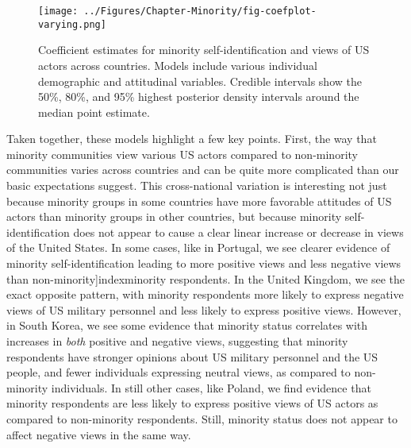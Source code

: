 \begin{figure}[t]
	\texttt{[image: ../Figures/Chapter-Minority/fig-coefplot-varying.png]}
	\caption{Coefficient estimates for minority self-identification and views of US actors across countries. Models include various individual demographic and attitudinal variables. Credible intervals show the 50\%, 80\%, and 95\% highest posterior density intervals around the median point estimate.}
	\label{fig:minoritycoefvarying}
\end{figure}


Taken together, these models highlight a few key points. First, the way that minority communities view various US actors compared to non-minority communities varies across countries and can be quite more complicated than our basic expectations suggest. This cross-national variation is interesting not just because minority groups in some countries have more favorable attitudes of US actors than minority groups in other countries, but because minority self-identification does not appear to cause a clear linear increase or decrease in views of the United States. In some cases, like in Portugal, we see clearer evidence of minority self-identification leading to more positive views and less negative views than non-minority]index{minority} respondents. In the United Kingdom, we see the exact opposite pattern, with minority respondents more likely to express negative views of US military personnel and less likely to express positive views. However, in South Korea, we see some evidence that minority status correlates with increases in \textit{both} positive and negative views, suggesting that minority respondents have stronger opinions about US military personnel and the US people, and fewer individuals expressing neutral views, as compared to non-minority individuals. In still other cases, like Poland, we find evidence that minority respondents are less likely to express positive views of US actors as compared to non-minority respondents. Still, minority status does not appear to affect negative views in the same way. 





